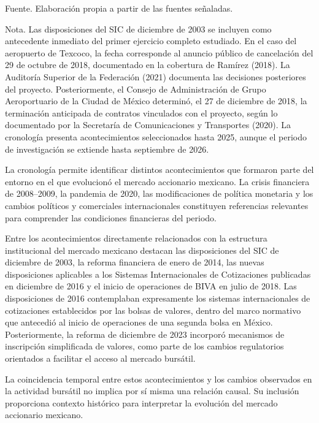 Fuente. Elaboración propia a partir de las fuentes señaladas.

Nota. Las disposiciones del SIC de diciembre de 2003 se incluyen como antecedente inmediato del primer ejercicio completo estudiado. En el caso del aeropuerto de Texcoco, la fecha corresponde al anuncio público de cancelación del 29 de octubre de 2018, documentado en la cobertura de Ramírez (2018). La Auditoría Superior de la Federación (2021) documenta las decisiones posteriores del proyecto. Posteriormente, el Consejo de Administración de Grupo Aeroportuario de la Ciudad de México determinó, el 27 de diciembre de 2018, la terminación anticipada de contratos vinculados con el proyecto, según lo documentado por la Secretaría de Comunicaciones y Transportes (2020). La cronología presenta acontecimientos seleccionados hasta 2025, aunque el periodo de investigación se extiende hasta septiembre de 2026.

La cronología permite identificar distintos acontecimientos que formaron parte del entorno en el que evolucionó el mercado accionario mexicano. La crisis financiera de 2008--2009, la pandemia de 2020, las modificaciones de política monetaria y los cambios políticos y comerciales internacionales constituyen referencias relevantes para comprender las condiciones financieras del periodo.

Entre los acontecimientos directamente relacionados con la estructura institucional del mercado mexicano destacan las disposiciones del SIC de diciembre de 2003, la reforma financiera de enero de 2014, las nuevas disposiciones aplicables a los Sistemas Internacionales de Cotizaciones publicadas en diciembre de 2016 y el inicio de operaciones de BIVA en julio de 2018. Las disposiciones de 2016 contemplaban expresamente los sistemas internacionales de cotizaciones establecidos por las bolsas de valores, dentro del marco normativo que antecedió al inicio de operaciones de una segunda bolsa en México. Posteriormente, la reforma de diciembre de 2023 incorporó mecanismos de inscripción simplificada de valores, como parte de los cambios regulatorios orientados a facilitar el acceso al mercado bursátil.

La coincidencia temporal entre estos acontecimientos y los cambios observados en la actividad bursátil no implica por sí misma una relación causal. Su inclusión proporciona contexto histórico para interpretar la evolución del mercado accionario mexicano.


